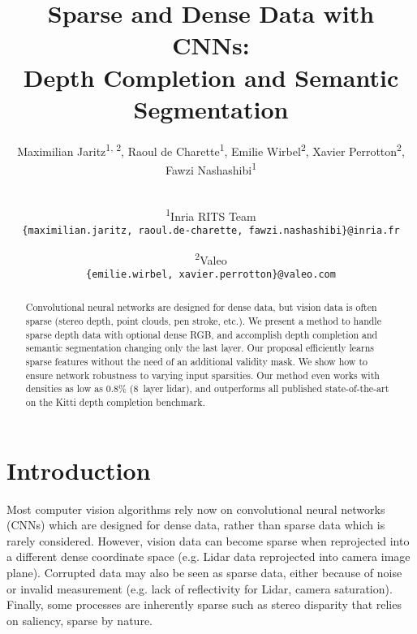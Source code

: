 \documentclass[10pt,twocolumn,letterpaper]{article}
\begin{document}
\title{Sparse and Dense Data with CNNs:\\Depth Completion and Semantic Segmentation}



\author{
Maximilian Jaritz\textsuperscript{1, 2}, Raoul de Charette\textsuperscript{1}, Emilie Wirbel\textsuperscript{2}, Xavier Perrotton\textsuperscript{2}, Fawzi Nashashibi\textsuperscript{1}\\\\
	\and
	\textsuperscript{1}Inria RITS Team\\
	{\tt\small \{maximilian.jaritz, raoul.de-charette, fawzi.nashashibi\}@inria.fr}
	\and
	\textsuperscript{2}Valeo\\
	{\tt\small \{emilie.wirbel, xavier.perrotton\}@valeo.com}
}

\maketitle


\begin{abstract}
Convolutional neural networks are designed for dense data, but vision data is often sparse (stereo depth, point clouds, pen stroke, etc.).
We present a method to handle sparse depth data with optional dense RGB, and accomplish depth completion and semantic segmentation changing only the last layer. 
Our proposal efficiently learns sparse features without the need of an additional validity mask.
We show how to ensure network robustness to varying input sparsities. Our method even works with densities as low as $0.8\%$ (8~layer lidar), and outperforms all published state-of-the-art on the Kitti depth completion benchmark.
\end{abstract}

\section{Introduction}

Most computer vision algorithms rely now on convolutional neural networks (CNNs) which are designed for dense data, rather than sparse data which is rarely considered.
However, vision data can become sparse when reprojected into a different dense coordinate space
(e.g. Lidar data reprojected into camera image plane).
Corrupted data may also be seen as sparse data, either because of noise or invalid measurement (e.g. lack of reflectivity for Lidar, camera saturation).
Finally, some processes are inherently sparse such as stereo disparity that relies on saliency, sparse by nature.
\end{document}
